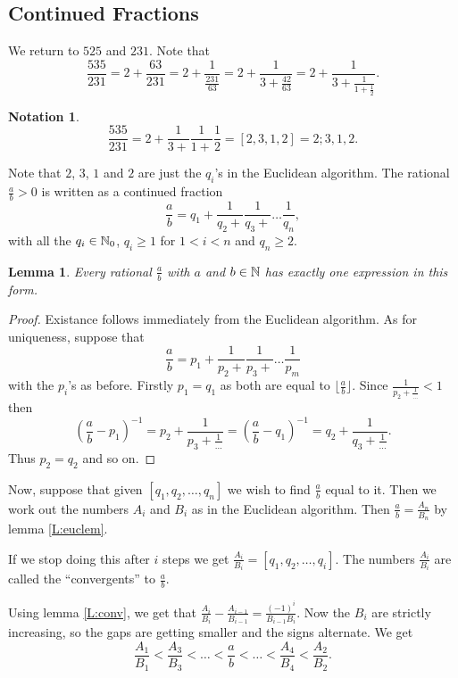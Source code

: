 \documentclass{notes}
\theoremstyle{plain}
\newtheorem{lemma}{Lemma}[chapter]
\newtheorem*{notation}{Notation}
\begin{document}
\subsection{Continued Fractions}

We return to $525$ and $231$.  Note that
\[
\frac{535}{231} = 2 + \frac{63}{231} = 2 + \frac{1}{\frac{231}{63}}
= 2 + \frac{1}{3 + \frac{42}{63}} = 2 + \frac{1}{3 + \frac{1}{1 +
\frac{1}{2}}}.
\]

\begin{notation}
\[
\frac{535}{231} = 2 + \frac{1}{3+} \frac{1}{1+} \frac{1}{2}
= \left[2,3,1,2\right] = 2;3,1,2.
\]
\end{notation}

Note that $2$, $3$, $1$ and $2$ are just the $q_i$'s in the
Euclidean algorithm.  The rational $\frac{a}{b} > 0$ is written as a
continued fraction
\[
\frac{a}{b} = q_1 + \frac{1}{q_2 +} \frac{1}{q_3 +}
\dots \frac{1}{q_n},
\]
with all the $q_i \in \mathbb{N}_0$, $q_i \ge 1$ for $1 < i < n$ and $q_n \ge 2$.

\begin{lemma}
Every rational $\frac{a}{b}$ with $a$ and $b \in \mathbb{N}$ has exactly one
expression in this form.
\end{lemma}

\begin{proof}
Existance follows immediately from the Euclidean algorithm.  As for
uniqueness, suppose that 
\[
\frac{a}{b} = p_1 + \frac{1}{p_2 +} \frac{1}{p_3 +}
\dots \frac{1}{p_m}
\]
with the $p_i$'s as before.  Firstly
$p_1 = q_1$ as both are equal to $\lfloor \frac{a}{b} \rfloor$.
Since $\frac{1}{p_2 + \frac{1}{\dots}} < 1$ then
\[
\left(
\frac{a}{b} - p_1
\right)^{-1}
= p_2 + \frac{1}{p_3 + \frac{1}{\dots}}
= \left(
\frac{a}{b} - q_1
\right)^{-1}
= q_2 + \frac{1}{q_3 + \frac{1}{\dots}}.
\]
Thus $p_2 = q_2$ and so on.
\end{proof}

Now, suppose that given $[q_1, q_2, \dots, q_n]$ we wish to find
$\frac{a}{b}$ equal to it.  Then we work out the numbers $A_i$ and $B_i$
as in the Euclidean algorithm.  Then $\frac{a}{b} = \frac{A_n}{B_n}$
by lemma \eqref{L:euclem}.

If we stop doing this after $i$ steps we get
$\frac{A_i}{B_i} = [q_1, q_2, \dots, q_i]$.  The numbers $\frac{A_i}{B_i}$
are called the ``convergents'' to $\frac{a}{b}$.

Using lemma \eqref{L:conv}, we get that $\frac{A_i}{B_i}
- \frac{A_{i-1}}{B_{i-1}} = \frac{(-1)^i}{B_{i-1} B_i}$.  Now the
$B_i$ are strictly increasing, so the gaps are getting smaller and the
signs alternate.  We get
\[
\frac{A_1}{B_1} < \frac{A_3}{B_3}
< \dots < \frac{a}{b} < \dots < \frac{A_4}{B_4} < \frac{A_2}{B_2}.
\]
\end{document}
